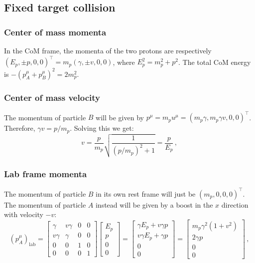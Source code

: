 \documentclass[main.tex]{subfiles}
\begin{document}
\subsection{Fixed target collision}

\subsubsection{Center of mass momenta}

In the CoM frame, the momenta of the two protons are respectively \((E_p, \pm p, 0,0)^\top = m_p (\gamma, \pm v, 0, 0)\), where \(E_p^2 = m_p^2 + p^2\).
The total CoM energy is \(-(p^\mu _A + p^\mu _B )^2 = 2 m_p^2\).

\subsubsection{Center of mass velocity}

The momentum of particle \(B\) will be given by \(p^{\mu } = m_p u^{\mu } = (m_p \gamma , m_p \gamma v, 0, 0)^\top\). Therefore, \(\gamma v = p / m_p\). Solving this we get: 
%
\begin{equation}
  v = \frac{p}{m_p} \sqrt{\frac{1}{(p/m_p)^{2} + 1}} = \frac{p}{E_p}
\,,
\end{equation}
%

\subsubsection{Lab frame momenta}

The momentum of particle \(B\) in its own rest frame will just be \((m_p, 0, 0, 0)^\top\).
The momentum of particle \(A\) instead will be given by a boost in the \(x\) direction with velocity \(-v\):
%
\begin{equation}
  (p_A^\mu) _{\text{lab}} = 
  \left[\begin{array}{cccc}
  \gamma  & v \gamma  & 0 & 0 \\ 
  v \gamma  & \gamma  & 0 & 0 \\ 
  0 & 0 & 1 & 0 \\ 
  0 & 0 & 0 & 1
  \end{array}\right]
  \left[\begin{array}{c}
  E_p  \\ 
  p \\ 
  0 \\ 
  0
  \end{array}\right]  
  = \left[\begin{array}{c}
    \gamma E_p + v \gamma p  \\ 
    v \gamma E_p + \gamma p \\ 
    0 \\ 
    0
    \end{array}\right]  
  = \left[\begin{array}{c}
    m_p \gamma^2 (1+v^2)  \\ 
    2 \gamma p\\ 
    0 \\ 
    0
    \end{array}\right]
\,,
\end{equation}
%
\end{document}
